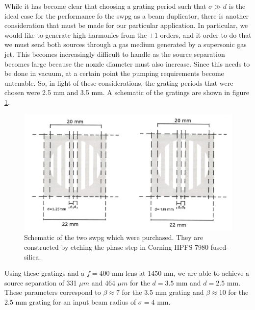 While it has become clear that choosing a grating period such that $\sigma\gg d$ is the ideal case for the performance fo the \gls{swpg} as a beam duplicator, there is another consideration that must be made for our particular application.  In particular, we would like to generate high-harmonics from the $\pm1$ orders, and it order to do that we must send both sources through a gas medium generated by a supersonic gas jet.  This becomes increasingly difficult to handle as the source separation becomes large because the nozzle diameter must also increase.  Since this needs to be done in vacuum, at a certain point the pumping requirements become untenable.  So, in light of these considerations, the grating periods that were chosen were 2.5 mm and 3.5 mm.  A schematic of the gratings are shown in figure \ref{fig:silios_sketch}.
\begin{figure}
	\centering
	\includegraphics[width=1.0\textwidth]{figures/Two_source/silios_sketch.png}
	\caption{Schematic of the two \gls{swpg} which were purchased.  They are constructed by etching the phase step in Corning HPFS 7980 fused-silica.}
	\label{fig:silios_sketch}
\end{figure}
Using these gratings and a $f=400$ mm lens at 1450 nm, we are able to achieve a source separation of 331 $\mu m$ and 464 $\mu m$ for the $d=3.5$ mm and $d=2.5$ mm.  These parameters correspond to $\beta\approx7$ for the 3.5 mm grating and $\beta\approx10$ for the 2.5 mm grating for an input beam radius of $\sigma=4$ mm.


